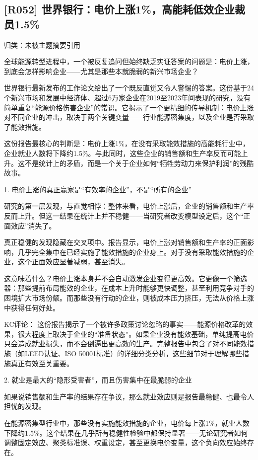 \documentclass[11pt]{ctexart}
\begin{document}
\subsection{[R052] 世界银行：电价上涨1\%，高能耗低效企业裁员1.5\%}
{\small\color{refgray}归类：未被主题摘要引用}

全球能源转型进程中，一个被反复追问但始终缺乏实证答案的问题是：电价上涨，到底会怎样影响企业——尤其是那些本就脆弱的新兴市场企业？

世界银行最新发布的工作论文给出了一个既反直觉又令人警惕的答案。这份基于24个新兴市场和发展中经济体、超过6万家企业在2019至2023年间表现的研究，没有简单重复“能源价格伤害企业”的常识。它揭示了一个更精细的传导机制：电价上涨对不同企业的冲击，取决于两个关键变量——行业能源密集度，以及企业是否采取了能效措施。

这份报告最核心的判断是：电价上涨1\%，在没有采取能效措施的高能耗行业中，企业就业人数将下降约1.5\%。与此同时，这些企业的销售额和生产率反而可能上升。这不是统计上的矛盾，而是一个关于企业如何“牺牲劳动力来保护利润”的残酷故事。

1. 电价上涨的真正赢家是“有效率的企业”，不是“所有的企业”

研究的第一层发现，与直觉相悖：整体来看，电价上涨后，企业的销售额和生产率反而上升。但这一结果在统计上并不稳健——当研究者改变模型设定后，这个“正面效应”消失了。

真正稳健的发现隐藏在交叉项中。报告显示，电价上涨对销售额和生产率的正面影响，几乎完全集中在已经实施了能效措施的企业身上。对于没有采取能效措施的企业，这个正面效应显著减弱，甚至消失。

这意味着什么？电价上涨本身并不会自动激发企业变得更高效。它更像一个筛选器：那些提前布局能效的企业，在成本上升时能够更快调整，甚至利用竞争对手的困境扩大市场份额。而那些没有行动的企业，则被成本压力挤压，无法从价格上涨中获得任何好处。

KC评论： 这份报告揭示了一个被许多政策讨论忽略的事实——能源价格改革的效果，很大程度上取决于企业的“准备状态”。如果企业没有能效基础，单纯提高电价只会造成就业损失，而不会倒逼出更高效的生产。完整报告中包含了对不同能效措施（如LEED认证、ISO 50001标准）的详细分类分析，这些细节对于理解哪些措施真正有效至关重要。

2. 就业是最大的“隐形受害者”，而且伤害集中在最脆弱的企业

如果说销售额和生产率的结果存在争议，那么就业效应则是报告最稳健、也最令人担忧的发现。

在能源密集型行业中，那些没有实施能效措施的企业，电价每上涨1\%，就业人数下降约1.5\%。这个结果在几乎所有稳健性检验中都保持显著——无论研究者如何调整固定效应、聚类标准误、权重设定，甚至更换电价变量，这个负向效应始终存在。
\end{document}
